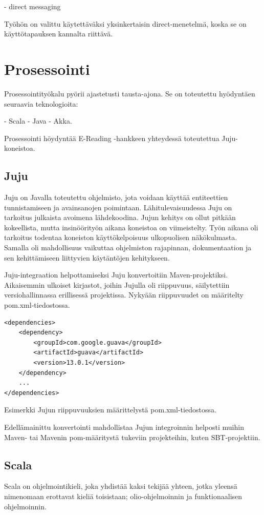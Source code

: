 \documentclass[11pt,a4paper,oneside]{memoir}
\begin{document}
- direct messaging 

Työhön on valittu käytettäväksi yksinkertaisin direct-menetelmä, koska se on käyttötapauksen kannalta riittävä.

\section{Prosessointi}
Prosessointityökalu pyörii ajastetusti tausta-ajona. Se on toteutettu hyödyntäen seuraavia teknologioita:

- Scala
- Java
- Akka.

Prosessointi höydyntää E-Reading -hankkeen yhteydessä toteutettua Juju-koneistoa.

\subsection{Juju}
Juju on Javalla toteutettu ohjelmisto, jota voidaan käyttää entiteettien tunnistamiseen ja avainsanojen poimintaan. Lähitulevaisuudessa Juju on tarkoitus julkaista avoimena lähdekoodina. Jujun kehitys on ollut pitkään kokeellista, mutta insinöörityön aikana koneistoa on viimeistelty. Työn aikana oli tarkoitus todentaa koneiston käyttökelpoisuus ulkopuolisen näkökulmasta. Samalla oli mahdollisuus vaikuttaa ohjelmiston rajapinnan, dokumentaation ja sen kehittämiseen liittyvien käytäntöjen kehitykseen.

Juju-integraation helpottamiseksi Juju konvertoitiin Maven-projektiksi. Aikaisemmin ulkoiset kirjastot, joihin Jujulla oli riippuvuus, säilytettiin versiohallinnassa erillisessä projektissa. Nykyään riippuvuudet on määritelty pom.xml-tiedostossa.

\begin{program}
  \begin{verbatim}
<dependencies>
    <dependency>
        <groupId>com.google.guava</groupId>
        <artifactId>guava</artifactId>
        <version>13.0.1</version>
    </dependency>
    ...
</dependencies> \end{verbatim} 
  \caption{Esimerkki Jujun riippuvuuksien määrittelystä pom.xml-tiedostossa.}
\end{program}

Edellämainittu konvertointi mahdollistaa Jujun integroinnin helposti muihin Maven- tai Mavenin pom-määritystä tukeviin projekteihin, kuten SBT-projektiin.

\subsection{Scala}
Scala on ohjelmointikieli, joka yhdistää kaksi tekijää yhteen, jotka yleensä nimenomaan erottavat kieliä toisistaan; olio-ohjelmoinnin ja funktionaalisen ohjelmoinnin. 
\cite{scala-by-example}
\end{document}
